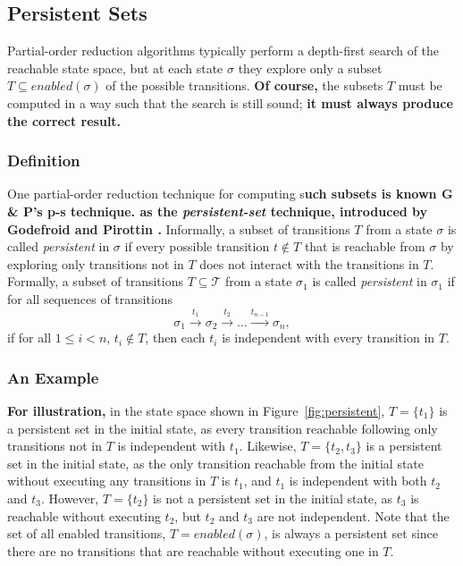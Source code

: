 \documentclass[12pt,a4paper,twoside,openright]{report}
\begin{document}
\subsection{Persistent Sets}
\label{sec:persistent}

Partial-order reduction algorithms typically 
perform a depth-first
search of the reachable state space, but at each
state $\sigma$ they explore only a subset
$T \subseteq \textit{enabled}(\sigma)$
of the possible transitions.
\textbf{Of course, }the subsets
$T$ must be computed in a way such that the search
is still sound; \textbf{it must always
produce the correct result.}

\subsubsection{Definition}
One partial-order reduction technique for
computing s\textbf{uch subsets is known
G \& P's p-s technique.
as the \emph{persistent-set} technique, introduced
by Godefroid and Pirottin \cite{god93}.} Informally,
a subset of transitions $T$ from a state $\sigma$
is called \emph{persistent} in $\sigma$ if every
possible transition $t \not \in T$ that is reachable
from $\sigma$ by exploring only transitions not in
$T$ does not interact with the transitions
in $T$. Formally, a subset of transitions $T \subseteq \mathcal{T}$
from a state $\sigma_1$
is called \emph{persistent} in $\sigma_1$ if
for all sequences of transitions
\[
	\sigma_1 \xrightarrow{\ t_1\ } \sigma_2 \xrightarrow{\ t_2\ } \ldots
	\xrightarrow{t_{n-1}} \sigma_n,
\]
if for all $1 \leq i < n$, $t_i \not \in T$, then each $t_i$ is
independent with every transition in $T$.

\subsubsection{An Example}
\textbf{For illustration, }in the state space shown in
Figure~\ref{fig:persistent}, $T = \{t_1\}$ is
a persistent set in the initial state, as every
transition reachable following only transitions
not in $T$ is independent with $t_1$.
Likewise, $T = \{t_2, t_3\}$ is
a persistent set in the initial state, as the
only transition reachable from the initial state
without executing any transitions in $T$ is $t_1$,
and $t_1$ is independent with both $t_2$ and $t_3$.
However, $T = \{t_2\}$ is not a persistent set in the
initial state, as $t_3$ is reachable without
executing $t_2$, but $t_2$ and $t_3$ are not independent.
Note that the set of all enabled transitions,
$T = \textit{enabled}(\sigma)$, is always a
persistent set since there are no transitions
that are reachable without executing one in $T$.
\end{document}
